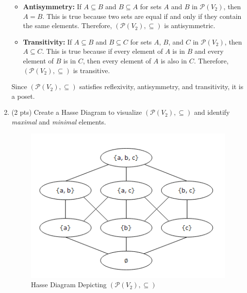 \documentclass[12pt]{article}
\begin{document}
\begin{spacing}{1.5}
\begin{enumerate}
\begin{itemize}
		      	\item \textbf{Antisymmetry:}
		      	      If \( A \subseteq B \) and \( B \subseteq A \) for sets \( A \) and \( B \) in \( \mathcal{P}(V_2) \), then \( A = B \). This is true because two sets are equal if and only if they contain the same elements. Therefore, \( (\mathcal{P}(V_2),\subseteq) \) is antisymmetric.
		      	      		      	                  
		      	\item \textbf{Transitivity:}
		      	      If \( A \subseteq B \) and \( B \subseteq C \) for sets \( A \), \( B \), and \( C \) in \( \mathcal{P}(V_2) \), then \( A \subseteq C \). This is true because if every element of \( A \) is in \( B \) and every element of \( B \) is in \( C \), then every element of \( A \) is also in \( C \). Therefore, \( (\mathcal{P}(V_2),\subseteq) \) is transitive.
		      \end{itemize}
		      		              
		      Since \( (\mathcal{P}(V_2),\subseteq) \) satisfies reflexivity, antisymmetry, and transitivity, it is a poset.
		      		              
		\item (2 pts) Create a Hasse Diagram to visualize $(\mathcal{P}(V_2),\subseteq)$ and identify \textit{maximal} and \textit{minimal} elements.
		      		      
		      \begin{figure}[htp]
		      	\centering
		      	\includegraphics{HasseDiagram_6_2_3.png}
		      	\caption{Hasse Diagram Depicting $(\mathcal{P}(V_2),\subseteq)$}
		      	\label{fig:figure}
		      \end{figure}
		      		        
	\end{enumerate}
			    

\end{spacing}
\end{document}
